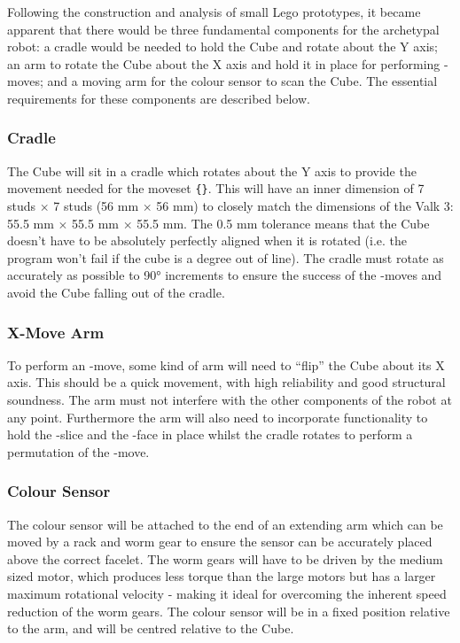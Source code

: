 \documentclass{report}
\newcommand{\movesetnospace}[1]{\uppercase{\texttt{\{\formatmovesnospace{#1}\}}}}
\newcommand{\face}[1]{\uppercase{\texttt{\formatmovesnospace{#1}}}-face}
\newcommand{\move}[1]{\uppercase{\texttt{\formatmovesnospace{#1}}}-move}
\newcommand{\slice}[1]{\uppercase{\texttt{\formatmovesnospace{#1}}}-slice}
\begin{document}
    Following the construction and analysis of small Lego prototypes, it became apparent that there would be three fundamental components for the archetypal robot: a cradle would be needed to hold the Cube and rotate about the Y axis; an arm to rotate the Cube about the X axis and hold it in place for performing \move{d}s; and a moving arm for the colour sensor to scan the Cube. The essential requirements for these components are described below.
    
    \subsubsection{Cradle}
    
    The Cube will sit in a cradle which rotates about the Y axis to provide the movement needed for the moveset \movesetnospace{Y.Y'y2D.D'd2}. This will have an inner dimension of 7 studs $\times$ 7 studs (56 \si{\milli\metre} $\times$ 56 \si{\milli\metre}) to closely match the dimensions of the Valk 3: 55.5 \si{\milli\metre} $\times$ 55.5 \si{\milli\metre} $\times$ 55.5 \si{\milli\metre}. The 0.5 \si{\milli\metre} tolerance means that the Cube doesn't have to be absolutely perfectly aligned when it is rotated (i.e. the program won't fail if the cube is a degree out of line). The cradle must rotate as accurately as possible to \ang{90} increments to ensure the success of the \move{x}s and avoid the Cube falling out of the cradle. 
    
    \subsubsection{X-Move Arm}
    To perform an \move{x}, some kind of arm will need to \enquote{flip} the Cube about its X axis. This should be a quick movement, with high reliability and good structural soundness. The arm must not interfere with the other components of the robot at any point. Furthermore the arm will also need to incorporate functionality to hold the \slice{l-r} and the \face{u} in place whilst the cradle rotates to perform a permutation of the \move{d}.
    
    \subsubsection{Colour Sensor}
    The colour sensor will be attached to the end of an extending arm which can be moved by a rack and worm gear to ensure the sensor can be accurately placed above the correct facelet. The worm gears will have to be driven by the medium sized motor, which produces less torque than the large motors but has a larger maximum rotational velocity - making it ideal for overcoming the inherent speed reduction of the worm gears. The colour sensor will be in a fixed position relative to the arm, and will be centred relative to the Cube.
    
\end{document}
